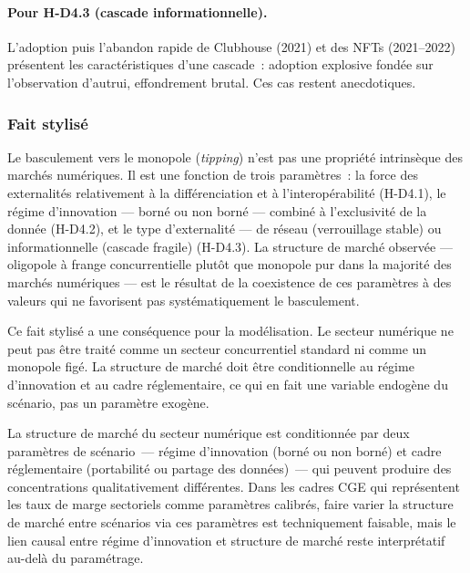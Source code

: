 \paragraph{Pour H-D4.3 (cascade informationnelle).} L'adoption puis l'abandon rapide de Clubhouse (2021) et des NFTs (2021--2022) présentent les caractéristiques d'une cascade~: adoption explosive fondée sur l'observation d'autrui, effondrement brutal. Ces cas restent anecdotiques.


\subsubsection{Fait stylisé}

Le basculement vers le monopole (\emph{tipping}) n'est pas une propriété intrinsèque des marchés numériques. Il est une fonction de trois paramètres~: la force des externalités relativement à la différenciation et à l'interopérabilité (H-D4.1), le régime d'innovation --- borné ou non borné --- combiné à l'exclusivité de la donnée (H-D4.2), et le type d'externalité --- de réseau (verrouillage stable) ou informationnelle (cascade fragile) (H-D4.3). La structure de marché observée --- oligopole à frange concurrentielle plutôt que monopole pur dans la majorité des marchés numériques \parencite{isaac_plateformes_2015} --- est le résultat de la coexistence de ces paramètres à des valeurs qui ne favorisent pas systématiquement le basculement.

Ce fait stylisé a une conséquence pour la modélisation. Le secteur numérique ne peut pas être traité comme un secteur concurrentiel standard ni comme un monopole figé. La structure de marché doit être conditionnelle au régime d'innovation et au cadre réglementaire, ce qui en fait une variable endogène du scénario, pas un paramètre exogène.

La structure de marché du secteur numérique est conditionnée par deux paramètres de scénario~--- régime d'innovation (borné ou non borné) et cadre réglementaire (portabilité ou partage des données)~--- qui peuvent produire des concentrations qualitativement différentes. Dans les cadres CGE qui représentent les taux de marge sectoriels comme paramètres calibrés, faire varier la structure de marché entre scénarios via ces paramètres est techniquement faisable, mais le lien causal entre régime d'innovation et structure de marché reste interprétatif au-delà du paramétrage.




